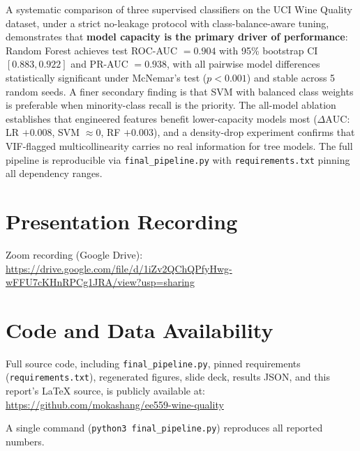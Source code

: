 \documentclass[conference]{IEEEtran}
\begin{document}
A systematic comparison of three supervised classifiers on the UCI
Wine Quality dataset, under a strict no-leakage protocol with
class-balance-aware tuning, demonstrates that \textbf{model capacity is
the primary driver of performance}: Random Forest achieves test
ROC-AUC $= 0.904$ with 95\% bootstrap CI $[0.883, 0.922]$ and PR-AUC
$= 0.938$, with all pairwise model differences statistically significant
under McNemar's test ($p < 0.001$) and stable across 5 random seeds.
A finer secondary finding is that SVM with balanced class weights is
preferable when minority-class recall is the priority. The all-model
ablation establishes that engineered features benefit lower-capacity
models most ($\Delta\text{AUC}$: LR $+0.008$, SVM $\approx 0$, RF
$+0.003$), and a density-drop experiment confirms that VIF-flagged
multicollinearity carries no real information for tree models. The
full pipeline is reproducible via \texttt{final\_pipeline.py} with
\texttt{requirements.txt} pinning all dependency ranges.

\section*{Presentation Recording}

\noindent Zoom recording (Google Drive):\\
\url{https://drive.google.com/file/d/1iZv2QChQPfyHwg-wFFU7cKHnRPCg1JRA/view?usp=sharing}

\section*{Code and Data Availability}

Full source code, including \texttt{final\_pipeline.py}, pinned
requirements (\texttt{requirements.txt}), regenerated figures, slide
deck, results JSON, and this report's LaTeX source, is publicly
available at:\\
\url{https://github.com/mokashang/ee559-wine-quality}

A single command (\texttt{python3 final\_pipeline.py}) reproduces
all reported numbers.
\end{document}

